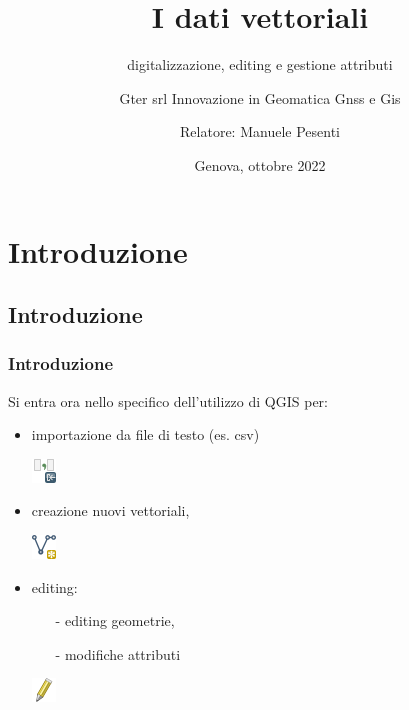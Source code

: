 \documentclass{beamer}
\title{I dati vettoriali}
\subtitle{digitalizzazione, editing e gestione attributi}
\author[]{Gter srl Innovazione in Geomatica Gnss e Gis}
\author[]{Relatore: Manuele Pesenti}
\date{Genova, ottobre 2022}
\begin{document}
	{
		{
			\begin{frame}
				\titlepage
			\end{frame}
		}
		\addtocounter{framenumber}{-1}

\section{Introduzione}
\subsection{Introduzione}

 \begin{frame}
   \frametitle{Introduzione}
    Si entra ora nello specifico dell'utilizzo di QGIS per: 
    \begin{itemize}
    	\item importazione da file di testo (es. csv)
    	\begin{center}
    		\includegraphics[height=0.6 cm] {digitizing_pics/delimited_text.png}
    	\end{center}
    	\item creazione nuovi vettoriali, 
    	\begin{center}
    		\includegraphics[height=0.6 cm] {digitizing_pics/new.png}
    	\end{center}
    	\item editing:
    	 \begin{itemize}
    			\item [-] editing geometrie, 
    			\item [-] modifiche attributi  
    	\end{itemize}
    	    	\begin{center}
    		\includegraphics[height=0.6 cm] {digitizing_pics/edit.png}
    	\end{center}  
    \end{itemize}
    
\end{frame} 


}
\end{document}
